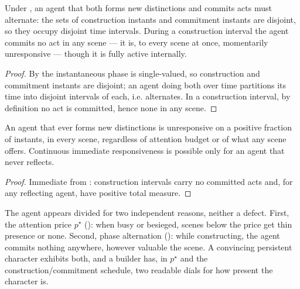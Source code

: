 \documentclass[11pt,twocolumn,a4paper]{article}
\newcommand{\price}{p^{\star}}       %
\begin{document}
\begin{theorem}
\label{thm:alternation}
Under , an agent that both forms new distinctions and
commits acts must alternate: the sets of construction instants and
commitment instants are disjoint, so they occupy disjoint time intervals.
During a construction interval the agent commits no act in any scene ---
it is, to every scene at once, momentarily unresponsive --- though it is
fully active internally.
\end{theorem}

\begin{proof}
By  the instantaneous phase is single-valued, so
construction and commitment instants are disjoint; an agent doing both
over time partitions its time into disjoint intervals of each, i.e.
alternates. In a construction interval, by definition no act is committed,
hence none in any scene.
\end{proof}

\begin{corollary}
\label{cor:intermittent}
An agent that ever forms new distinctions is unresponsive on a positive
fraction of instants, in every scene, regardless of attention budget or of
what any scene offers. Continuous immediate responsiveness is possible
only for an agent that never reflects.
\end{corollary}

\begin{proof}
Immediate from : construction intervals carry no
committed acts and, for any reflecting agent, have positive total measure.
\end{proof}

\begin{remark}
\label{rem:two-faces}
The agent appears divided for two independent reasons, neither a defect.
First, the attention price $\price$ (): when busy or
besieged, scenes below the price get thin presence or none. Second, phase
alternation (): while constructing, the agent
commits nothing anywhere, however valuable the scene. A convincing
persistent character exhibits both, and a builder has, in $\price$ and the
construction/commitment schedule, two readable dials for how present the
character is.
\end{remark}

\end{document}
